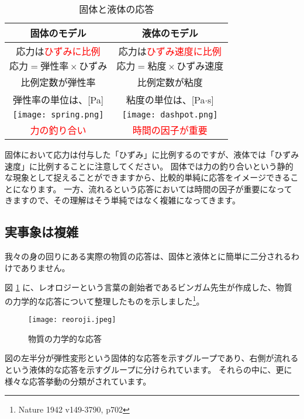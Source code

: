 \documentclass[uplatex,dvipdfmx,a4paper,11pt]{jsreport}
\begin{document}
\begin{table}[htb]
	\caption{固体と液体の応答}
	\label{tab:kotaiekitai2}
	\begin{center}
		\begin{tabular}{|c||c|} \hline
			固体のモデル & 液体のモデル \\ \hline \hline
			応力は\textcolor{red}{ひずみに比例} & 応力は\textcolor{red}{ひずみ速度に比例}\\
			$\text{応力} = \text{弾性率} \times \text{ひずみ}$	& $\text{応力} = \text{粘度} \times \text{ひずみ速度}$ \\ \hline
			比例定数が弾性率 & 比例定数が粘度\\ 
			弾性率の単位は、[Pa] & 粘度の単位は、[Pa$\cdot$s]\\ \hline
			\texttt{[image: spring.png]} & \texttt{[image: dashpot.png]} \\ \hline
			\textcolor{red}{力の釣り合い} &  \textcolor{red}{時間の因子が重要} \\ \hline
		\end{tabular}
	\end{center}
\end{table}

固体において応力は付与した「ひずみ」に比例するのですが、液体では「ひずみ速度」に比例することに注意してください。
固体では力の釣り合いという静的な現象として捉えることができますから、比較的単純に応答をイメージできることになります。
一方、流れるという応答においては時間の因子が重要になってきますので、その理解はそう単純ではなく複雑になってきます。

\subsection{実事象は複雑}
我々の身の回りにある実際の物質の応答は、固体と液体とに簡単に二分されるわけでありません。

図 \ref{fig:outou_bingum} に、レオロジーという言葉の創始者であるビンガム先生が作成した、物質の力学的な応答について整理したものを示しました\footnote{
	Nature 1942 v149-3790, p702
}。

\begin{figure}[htb]
	\begin{center}
		\texttt{[image: reoroji.jpeg]}
		\caption{物質の力学的な応答}
		\label{fig:outou_bingum}
	\end{center}
\end{figure}

図の左半分が弾性変形という固体的な応答を示すグループであり、右側が流れるという液体的な応答を示すグループに分けられています。
それらの中に、更に様々な応答挙動の分類がされています。
\end{document}
